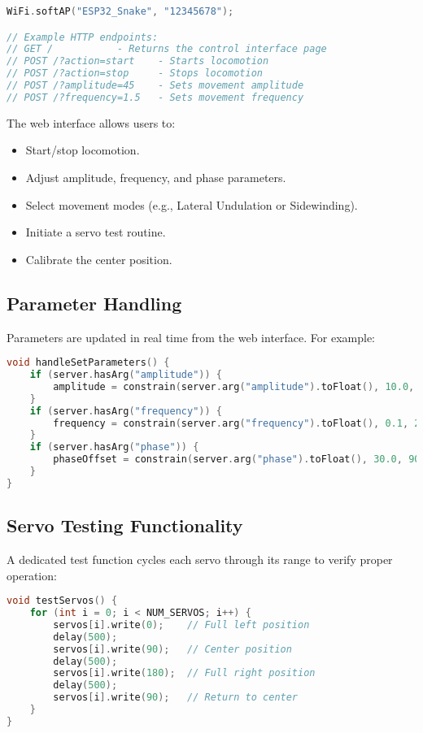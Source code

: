 \documentclass[12pt,a4paper]{report}
\begin{document}
\begin{lstlisting}[language=C++]
WiFi.softAP("ESP32_Snake", "12345678");

// Example HTTP endpoints:
// GET /           - Returns the control interface page
// POST /?action=start    - Starts locomotion
// POST /?action=stop     - Stops locomotion
// POST /?amplitude=45    - Sets movement amplitude
// POST /?frequency=1.5   - Sets movement frequency
\end{lstlisting}

The web interface allows users to:
\begin{itemize}
    \item Start/stop locomotion.
    \item Adjust amplitude, frequency, and phase parameters.
    \item Select movement modes (e.g., Lateral Undulation or Sidewinding).
    \item Initiate a servo test routine.
    \item Calibrate the center position.
\end{itemize}

\subsection{Parameter Handling}
Parameters are updated in real time from the web interface. For example:

\begin{lstlisting}[language=C++]
void handleSetParameters() {
    if (server.hasArg("amplitude")) {
        amplitude = constrain(server.arg("amplitude").toFloat(), 10.0, 45.0);
    }
    if (server.hasArg("frequency")) {
        frequency = constrain(server.arg("frequency").toFloat(), 0.1, 2.0);
    }
    if (server.hasArg("phase")) {
        phaseOffset = constrain(server.arg("phase").toFloat(), 30.0, 90.0);
    }
}
\end{lstlisting}

\subsection{Servo Testing Functionality}
A dedicated test function cycles each servo through its range to verify proper operation:

\begin{lstlisting}[language=C++]
void testServos() {
    for (int i = 0; i < NUM_SERVOS; i++) {
        servos[i].write(0);    // Full left position
        delay(500);
        servos[i].write(90);   // Center position
        delay(500);
        servos[i].write(180);  // Full right position
        delay(500);
        servos[i].write(90);   // Return to center
    }
}
\end{lstlisting}
\end{document}
